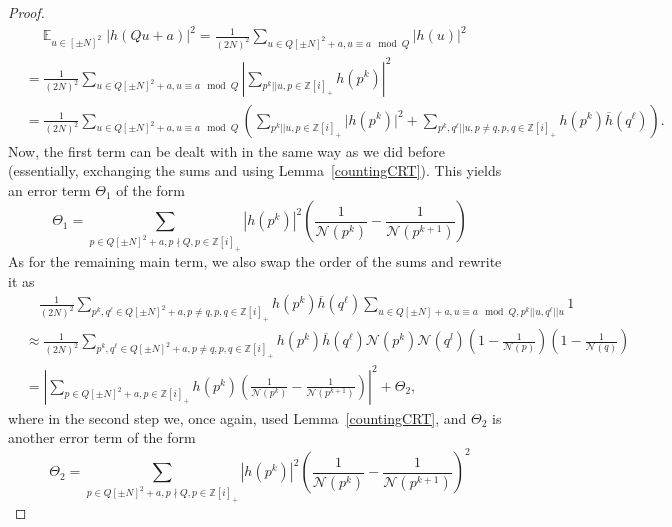 \documentclass[11pt]{amsart}
\theoremstyle{definition}
\DeclareMathOperator*{\E}{\mathbb{E}}
\newcommand{\NN}{{\mathcal N}}
\newcommand{\Z}{{\mathbb Z}}
\begin{document}
\begin{proof}
{\begin{equation}
    \begin{split}
        &\quad \E_{u\in [\pm N]^2}\vert h(Qu+a)\vert^{2}
        =\frac{1}{(2N)^2}\sum_{u\in  Q[\pm N]^2+a, u\equiv a \mod Q}\vert h(u)\vert^{2}
        \\&=\frac{1}{(2N)^2}\sum_{u\in  Q[\pm N]^2+a, u\equiv a \mod Q}\left| \sum_{p^{k}|| u, p \in \Z[i]_+} h(p^{k})\right|^{2}
        \\&=\frac{1}{(2N)^2}\sum_{u\in  Q[\pm N]^2+a, u\equiv a \mod Q}\left(\sum_{p^{k}|| u, p \in \Z[i]_+} \vert h(p^{k})\vert^{2}+\sum_{p^{k},q^{\ell}|| u, p\neq q, p, q \in \Z[i]_+} h(p^{k})\overline{h}(q^{\ell})\right). 
    \end{split}
\end{equation}
Now, the first term can be dealt with in the same way as we did before (essentially, exchanging the sums and using Lemma~\ref{countingCRT}). This yields an error term $\Theta_1$ of the form
\[
\Theta_1=\sum_{p \in Q[\pm N]^2+a, p \nmid Q, p \in \Z[i]_+} |h(p^k)|^2 \left( \frac{1}{\NN(p^k)}-\frac{1}{\NN(p^{k+1})}\right)
\]
As for the remaining main term, we also swap the order of the sums and rewrite it as
\begin{equation}
    \begin{split}
        &\quad \frac{1}{(2N)^2}\sum_{p^{k},q^{\ell}\in Q[\pm N]^2+a, p\neq q, p,q\in \Z[i]_+} h(p^{k})\overline{h}(q^{\ell})\sum_{u\in Q[\pm N]+a, u\equiv a \mod Q, p^{k}||u, q^{\ell}||u}1
        \\&\approx \frac{1}{(2N)^2}\sum_{p^{k},q^{\ell}\in Q[\pm N]^2+a, p\neq q, p,q\in \Z[i]_+} h(p^{k})\overline{h}(q^{\ell})\NN(p^k)\NN(q^l)\left(1-\frac{1}{\NN(p)}\right) \left(1-\frac{1}{\NN(q)}\right)
        \\&= \left|\sum_{p \in Q[\pm N]^2+a, p \in \Z[i]_+} h(p^{k})\left( \frac{1}{\NN(p^k)}-\frac{1}{\NN(p^{k+1})}\right)\right|^2+\Theta_2,
    \end{split}
\end{equation}
where in the second step we, once again, used Lemma~\ref{countingCRT}, and $\Theta_2$ is another error term of the form
\[
\Theta_2=\sum_{p \in Q[\pm N]^2+a, p \nmid Q, p \in \Z[i]_+} |h(p^k)|^2 \left( \frac{1}{\NN(p^k)}-\frac{1}{\NN(p^{k+1})}\right)^2
\]
}
 

\end{proof}
\end{document}
